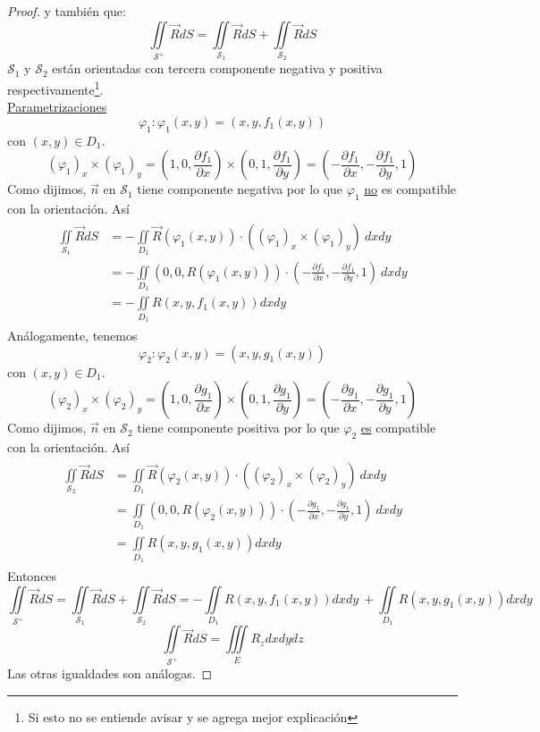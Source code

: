 \documentclass{report}
\begin{document}
\begin{proof}
y también que:
\[
	\iint\limits_{\mathcal{S}^+}{\vec{R}dS} =
	\iint\limits_{\mathcal{S}_1}{\vec{R}dS} +
	\iint\limits_{\mathcal{S}_2}{\vec{R}dS}
\]
$\mathcal{S}_1$ y $\mathcal{S}_2$ están orientadas con tercera componente negativa y positiva respectivamente\footnote{Si esto no se entiende avisar y se agrega mejor explicación}.\\
\underline{Parametrizaciones} \\ 
\[
	\varphi_1:\varphi_1(x,y) = (x,y,f_1(x,y))
\]
con $(x,y)\in D_1$. \\ 
\[
	(\varphi_1)_x \times (\varphi_1)_y = \left(1, 0, \frac{\partial{f_1}}{\partial{x}}\right) \times\left(0, 1, \frac{\partial{f_1}}{\partial{y}}\right) = \left(-\frac{\partial{f_1}}{\partial{x}},-\frac{\partial{f_1}}{\partial{y}},1\right)
\]
Como dijimos, $\vec{n}$ en $\mathcal{S}_1$ tiene componente negativa por lo que $\varphi_1$ \underline{no} es compatible con la orientación.
Así
\begin{gather*}
	\begin{aligned}
		\iint\limits_{\mathcal{S}_1}{\vec{R}dS} & = - \iint\limits_{D_1}{\vec{R}(\varphi_1(x,y))\cdot ((\varphi_1)_x\times (\varphi_1)_y)~dxdy} \\ 
		& = - \iint\limits_{D_1}{(0,0,R(\varphi_1(x,y)))\cdot (-\frac{\partial{f_1}}{\partial{x}},-\frac{\partial{f_1}}{\partial{y}},1)~dxdy} \\ 
		& = - \iint\limits_{D_1}{R(x,y,f_1(x,y))dxdy}
	\end{aligned}
\end{gather*}
Análogamente, tenemos
\[
	\varphi_2:\varphi_2(x,y) = (x,y,g_1(x,y))
\]
con $(x,y)\in D_1$. \\ 
\[
	(\varphi_2)_x \times (\varphi_2)_y = \left(1, 0, \frac{\partial{g_1}}{\partial{x}}\right) \times\left(0, 1, \frac{\partial{g_1}}{\partial{y}}\right) = \left(-\frac{\partial{g_1}}{\partial{x}},-\frac{\partial{g_1}}{\partial{y}},1\right)
\]
Como dijimos, $\vec{n}$ en $\mathcal{S}_2$ tiene componente positiva por lo que $\varphi_2$ \underline{es} compatible con la orientación.
Así
\begin{gather*}
	\begin{aligned}
		\iint\limits_{\mathcal{S}_2}{\vec{R}dS} & = \iint\limits_{D_1}{\vec{R}(\varphi_2(x,y))\cdot ((\varphi_2)_x\times (\varphi_2)_y)~dxdy} \\ 
		& = \iint\limits_{D_1}{(0,0,R(\varphi_2(x,y)))\cdot (-\frac{\partial{g_1}}{\partial{x}},-\frac{\partial{g_1}}{\partial{y}},1)~dxdy} \\ 
		& = \iint\limits_{D_1}{R(x,y,g_1(x,y))dxdy}
	\end{aligned}
\end{gather*}
Entonces
\[
	\iint\limits_{\mathcal{S}^+}{\vec{R}dS} =
	\iint\limits_{\mathcal{S}_1}{\vec{R}dS} +
	\iint\limits_{\mathcal{S}_2}{\vec{R}dS} =
	- \iint\limits_{D_1}{R(x,y,f_1(x,y))dxdy}~
	+ \iint\limits_{D_1}{R(x,y,g_1(x,y))dxdy}
\]
\[
	\iint\limits_{\mathcal{S}^+}{\vec{R}dS} =
	\iiint\limits_E{R_z dxdydz}
\]
Las otras igualdades son análogas.
\end{proof}
\end{document}
